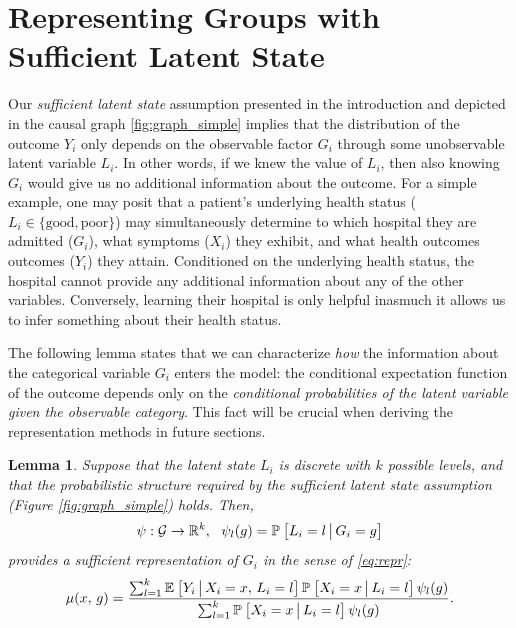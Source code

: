 \documentclass{article}
\theoremstyle{plain}
\newtheorem{lemm}[prop]{Lemma}
\theoremstyle{definition}
\theoremstyle{remark}
\begin{document}
\section{Representing Groups with Sufficient Latent State}

Our \emph{sufficient latent state} assumption presented in the introduction and depicted in the causal graph \ref{fig:graph_simple} implies that the distribution of the outcome $Y_{i}$ only depends on the observable factor $G_{i}$ through some unobservable latent variable $L_{i}$. In other words, if we knew the value of $L_{i}$, then also knowing $G_{i}$ would give us no additional information about the outcome. For a simple example, one may posit that a patient's underlying health status ($L_{i} \in \{\text{good}, \text{poor}\}$) may simultaneously determine to which hospital they are admitted ($G_{i}$), what symptoms ($X_i$) they exhibit, and what health outcomes outcomes ($Y_i$) they attain. Conditioned on the underlying health status, the hospital cannot provide any additional information about any of the other variables. Conversely, learning their hospital is only helpful inasmuch it allows us to infer something about their health status.

The following lemma states that we can characterize \emph{how} the information about the categorical variable $G_{i}$ enters the model: the conditional expectation function of the outcome depends only on the \emph{conditional probabilities of the latent variable given the observable category}. This fact will be crucial when deriving the representation methods in future sections.

\begin{lemm}
\label{lemm:repr}
Suppose that the latent state $L_i$ is discrete with $k$ possible levels, and that the probabilistic structure required by the sufficient latent state assumption (Figure \ref{fig:graph_simple}) holds. Then,
\begin{equation}
\label{eq:psi}
\psi: \mathcal{G} \rightarrow \mathbb{R}^k, \ \ \psi_l(g) = \mathbb{P}_{}\left[L_i = l \,\big|\, G_i = g\right]
\end{equation}
provides a sufficient representation of $G_i$ in the sense of \eqref{eq:repr}:
\begin{equation}
\label{eq:explicit}
\mu(x, \, g) = \frac{\sum_{l = 1}^k  \mathbb{E}_{}\left[Y_i \,\big|\, X_i = x, \, L_i = l\right] \mathbb{P}_{}\left[X_i = x \,\big|\, L_i = l\right] \psi_l(g)}{\sum_{l = 1}^k \mathbb{P}_{}\left[X_i = x \,\big|\, L_i = l\right] \psi_l(g)}.
\end{equation}
\end{lemm}
\end{document}
